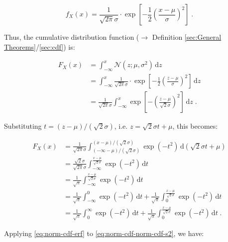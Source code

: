 \documentclass[a4paper,12pt,twoside]{book}
\begin{document}
\begin{equation} \label{eq:norm-cdf-norm-pdf}
f_X(x) = \frac{1}{\sqrt{2 \pi} \sigma} \cdot \exp \left[ -\frac{1}{2} \left( \frac{x-\mu}{\sigma} \right)^2 \right] \; .
\end{equation}

Thus, the cumulative distribution function ($\rightarrow$ Definition \ref{sec:General Theorems}/\ref{sec:cdf}) is:

\begin{equation} \label{eq:norm-cdf-norm-cdf-s1}
\begin{split}
F_X(x) &= \int_{-\infty}^{x} \mathcal{N}(z; \mu, \sigma^2) \, \mathrm{d}z \\
&= \int_{-\infty}^{x} \frac{1}{\sqrt{2 \pi} \sigma} \cdot \exp \left[ -\frac{1}{2} \left( \frac{z-\mu}{\sigma} \right)^2 \right] \, \mathrm{d}z \\
&= \frac{1}{\sqrt{2 \pi} \sigma} \int_{-\infty}^{x} \exp \left[ -\left( \frac{z-\mu}{\sqrt{2} \sigma} \right)^2 \right] \, \mathrm{d}z \; .
\end{split}
\end{equation}

Substituting $t = (z-\mu)/(\sqrt{2} \sigma)$, i.e. $z = \sqrt{2} \sigma t + \mu$, this becomes:

\begin{equation} \label{eq:norm-cdf-norm-cdf-s2}
\begin{split}
F_X(x) &= \frac{1}{\sqrt{2 \pi} \sigma} \int_{(-\infty-\mu)/(\sqrt{2} \sigma)}^{(x-\mu)/(\sqrt{2} \sigma)} \exp(-t^2) \, \mathrm{d}\left( \sqrt{2} \sigma t + \mu \right) \\
&= \frac{\sqrt{2} \sigma}{\sqrt{2 \pi} \sigma} \int_{-\infty}^{\frac{x-\mu}{\sqrt{2} \sigma}} \exp(-t^2) \, \mathrm{d}t \\
&= \frac{1}{\sqrt{\pi}} \int_{-\infty}^{\frac{x-\mu}{\sqrt{2} \sigma}} \exp(-t^2) \, \mathrm{d}t \\
&= \frac{1}{\sqrt{\pi}} \int_{-\infty}^{0} \exp(-t^2) \, \mathrm{d}t + \frac{1}{\sqrt{\pi}} \int_{0}^{\frac{x-\mu}{\sqrt{2} \sigma}} \exp(-t^2) \, \mathrm{d}t \\
&= \frac{1}{\sqrt{\pi}} \int_{0}^{\infty} \exp(-t^2) \, \mathrm{d}t + \frac{1}{\sqrt{\pi}} \int_{0}^{\frac{x-\mu}{\sqrt{2} \sigma}} \exp(-t^2) \, \mathrm{d}t \; .
\end{split}
\end{equation}

Applying \eqref{eq:norm-cdf-erf} to \eqref{eq:norm-cdf-norm-cdf-s2}, we have:
\end{document}
